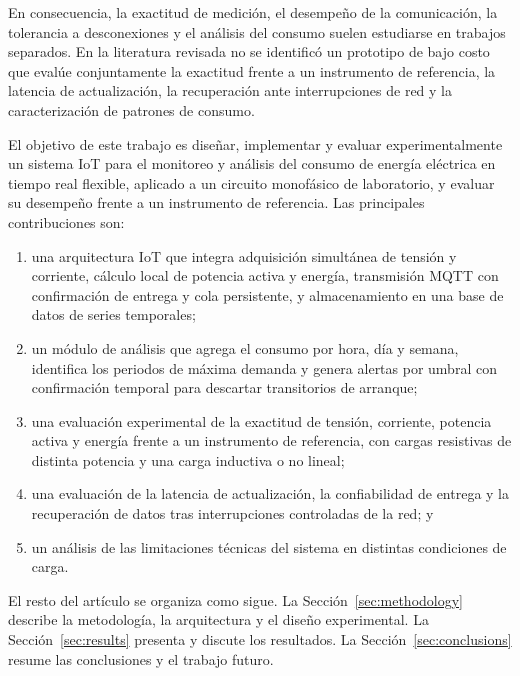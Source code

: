 En consecuencia, la exactitud de medición, el desempeño de la comunicación, la tolerancia a desconexiones y el análisis del consumo suelen estudiarse en trabajos separados.
En la literatura revisada no se identificó un prototipo de bajo costo que evalúe conjuntamente la exactitud frente a un instrumento de referencia, la latencia de actualización, la recuperación ante interrupciones de red y la caracterización de patrones de consumo.

El objetivo de este trabajo es diseñar, implementar y evaluar experimentalmente un sistema IoT para el monitoreo y análisis del consumo de energía eléctrica en tiempo real flexible, aplicado a un circuito monofásico de laboratorio, y evaluar su desempeño frente a un instrumento de referencia.
Las principales contribuciones son:
\begin{enumerate}
  \item una arquitectura IoT que integra adquisición simultánea de tensión y corriente, cálculo local de potencia activa y energía, transmisión MQTT con confirmación de entrega y cola persistente, y almacenamiento en una base de datos de series temporales;
  \item un módulo de análisis que agrega el consumo por hora, día y semana, identifica los periodos de máxima demanda y genera alertas por umbral con confirmación temporal para descartar transitorios de arranque;
  \item una evaluación experimental de la exactitud de tensión, corriente, potencia activa y energía frente a un instrumento de referencia, con cargas resistivas de distinta potencia y una carga inductiva o no lineal;
  \item una evaluación de la latencia de actualización, la confiabilidad de entrega y la recuperación de datos tras interrupciones controladas de la red; y
  \item un análisis de las limitaciones técnicas del sistema en distintas condiciones de carga.
\end{enumerate}

El resto del artículo se organiza como sigue.
La Sección~\ref{sec:methodology} describe la metodología, la arquitectura y el diseño experimental.
La Sección~\ref{sec:results} presenta y discute los resultados.
La Sección~\ref{sec:conclusions} resume las conclusiones y el trabajo futuro.
